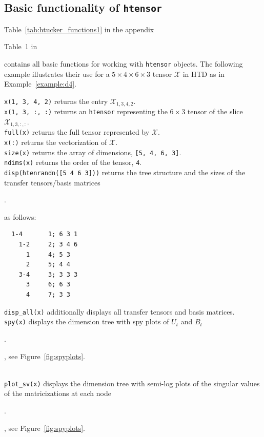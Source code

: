 \documentclass[11pt, a4paper]{article}
\newcommand{\calX}{\mathcal{X}}
\begin{document}
\subsection{Basic functionality of {\tt htensor}}
\begin{preprint}
Table~\ref{tab:htucker_functions1} in the appendix
\end{preprint}
\begin{submitted}
Table~1 in \cite{KreT11tr}
\end{submitted} 
contains all basic
functions for working with {\tt htensor} objects. The following
example illustrates their use for a $5\times 4\times
6\times 3$ tensor $\calX$ in HTD as in Example~\ref{example:d4}.
%
\begin{framed}
\noindent \texttt{x(1, 3, 4, 2)} returns the entry $\calX_{1,3,4,2}$.\\
\texttt{x(1, 3, :, :)} returns an \texttt{htensor} representing the $6\times 3$ tensor of the slice $\calX_{1,3,:,:}$.\\
\texttt{full(x)} returns the full tensor represented by $\calX$.\\
\texttt{x(:)} returns the vectorization of $\calX$. \\
\texttt{size(x)} returns the array of dimensions, \texttt{[5, 4, 6, 3]}. \\
\texttt{ndims(x)} returns the order of the tensor, \texttt{4}. \\
\texttt{disp(htenrandn([5 4 6 3]))} returns the tree structure and the sizes of the transfer tensors/basis matrices%
\begin{submitted}
.\\
\end{submitted}
\begin{preprint} as follows:
\vspace{-2ex}
\begin{verbatim}
  1-4       1; 6 3 1        
    1-2     2; 3 4 6        
      1     4; 5 3          
      2     5; 4 4          
    3-4     3; 3 3 3        
      3     6; 6 3          
      4     7; 3 3  
\end{verbatim}
\vspace{-2ex}
\end{preprint}
\texttt{disp\_all(x)} additionally displays all transfer tensors and basis matrices.\\
\texttt{spy(x)} displays the dimension tree with spy plots of $U_t$ and $B_t$%
\begin{submitted}
.
\end{submitted}
\begin{preprint}
, see Figure~\ref{fig:spyplots}.
\end{preprint}
\\
\texttt{plot\_sv(x)} displays the dimension tree with semi-log plots of the singular values of the matricizations at each node%
\begin{submitted}
.
\end{submitted}
\begin{preprint}
, see Figure~\ref{fig:spyplots}.
\end{preprint}
\end{framed}
\end{document}
